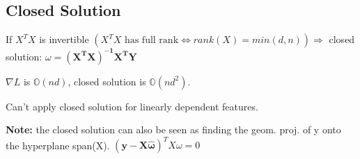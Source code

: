\subsection{Closed Solution}

If $X^TX $ is invertible $ (X^TX\text{ has full rank} \Leftrightarrow rank(X) = min(d,n)) \Rightarrow$ closed solution: $\omega = \boldsymbol{(X^TX)^{-1}X^TY}$

$\nabla L$ is $\mathbb{O}(nd)$, closed solution is $\mathbb{O}(nd^2)$.

Can't apply closed solution for linearly dependent features.

\textbf{Note:} the closed solution can also be seen as finding the geom. proj. of y onto the hyperplane span(X). $(\boldsymbol{y - X\hat{\omega}})^TX\omega = 0$